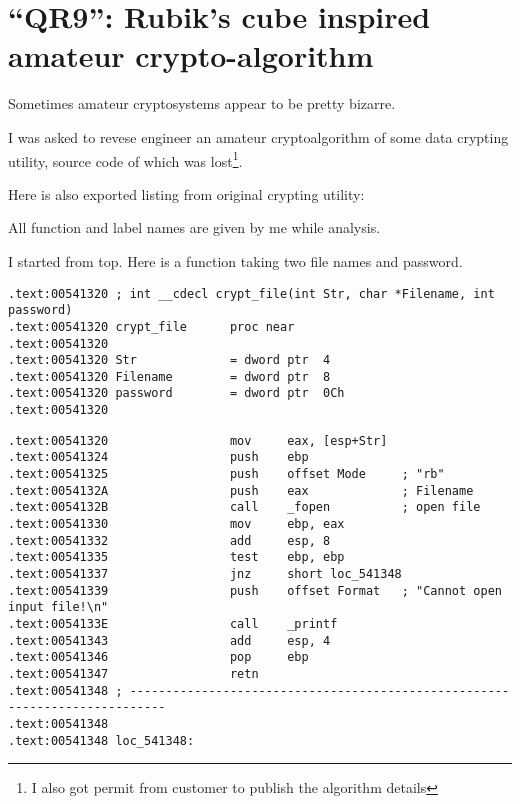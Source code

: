 \section{
{``QR9'': Rubik's cube inspired amateur crypto-algorithm}}

{Sometimes amateur cryptosystems appear to be pretty bizarre.}

{I was asked to revese engineer an amateur cryptoalgorithm of some data crypting utility, 
source code of which was lost\footnote{I also got permit from customer to publish the algorithm details}.}

{Here is also \IDA exported listing from original crypting utility}:



{All function and label names are given by me while analysis.}

{I started from top. Here is a function taking two file names and password.}

\begin{lstlisting}
.text:00541320 ; int __cdecl crypt_file(int Str, char *Filename, int password)
.text:00541320 crypt_file      proc near
.text:00541320
.text:00541320 Str             = dword ptr  4
.text:00541320 Filename        = dword ptr  8
.text:00541320 password        = dword ptr  0Ch
.text:00541320
\end{lstlisting}


\begin{lstlisting}
.text:00541320                 mov     eax, [esp+Str]
.text:00541324                 push    ebp
.text:00541325                 push    offset Mode     ; "rb"
.text:0054132A                 push    eax             ; Filename
.text:0054132B                 call    _fopen          ; open file
.text:00541330                 mov     ebp, eax
.text:00541332                 add     esp, 8
.text:00541335                 test    ebp, ebp
.text:00541337                 jnz     short loc_541348
.text:00541339                 push    offset Format   ; "Cannot open input file!\n"
.text:0054133E                 call    _printf
.text:00541343                 add     esp, 4
.text:00541346                 pop     ebp
.text:00541347                 retn
.text:00541348 ; ---------------------------------------------------------------------------
.text:00541348
.text:00541348 loc_541348:
\end{lstlisting}

